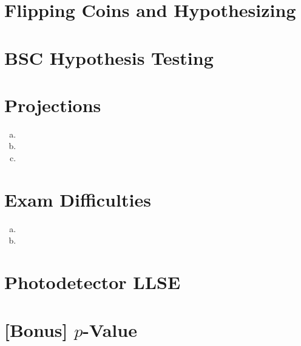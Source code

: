 \documentclass[11pt]{article}
\begin{document}
\section{Flipping Coins and Hypothesizing}

\section{BSC Hypothesis Testing}

\section{Projections}
\begin{enumerate}[(a)]
    \item

    \item

    \item
\end{enumerate}

\section{Exam Difficulties}
\begin{enumerate}[(a)]
    \item

    \item
\end{enumerate}

\section{Photodetector LLSE}

\section{[Bonus] $p$-Value}

\clearpage
\end{document}
